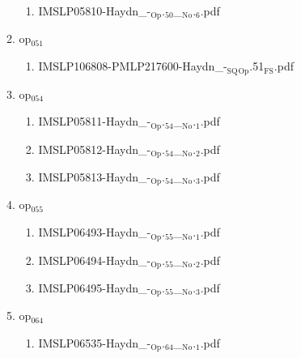 \documentclass[11pt]{article}
\begin{document}
\begin{enumerate}
\begin{enumerate}
\begin{enumerate}
\item IMSLP05810-Haydn\_-$_{\text{Op}}$.$_{\text{50}}$\_$_{\text{No}}$.$_{\text{6}}$.pdf
\label{sec-1-1-1-1-44-38-6-9-6}
\end{enumerate}

\item op$_{\text{051}}$
\label{sec-1-1-1-1-44-38-6-10}
\begin{enumerate}
\item IMSLP106808-PMLP217600-Haydn\_-$_{\text{SQ}}$$_{\text{Op}}$.51$_{\text{FS}}$.pdf
\label{sec-1-1-1-1-44-38-6-10-1}
\end{enumerate}

\item op$_{\text{054}}$
\label{sec-1-1-1-1-44-38-6-11}
\begin{enumerate}
\item IMSLP05811-Haydn\_-$_{\text{Op}}$.$_{\text{54}}$\_$_{\text{No}}$.$_{\text{1}}$.pdf
\label{sec-1-1-1-1-44-38-6-11-1}

\item IMSLP05812-Haydn\_-$_{\text{Op}}$.$_{\text{54}}$\_$_{\text{No}}$.$_{\text{2}}$.pdf
\label{sec-1-1-1-1-44-38-6-11-2}

\item IMSLP05813-Haydn\_-$_{\text{Op}}$.$_{\text{54}}$\_$_{\text{No}}$.$_{\text{3}}$.pdf
\label{sec-1-1-1-1-44-38-6-11-3}
\end{enumerate}

\item op$_{\text{055}}$
\label{sec-1-1-1-1-44-38-6-12}
\begin{enumerate}
\item IMSLP06493-Haydn\_-$_{\text{Op}}$.$_{\text{55}}$\_$_{\text{No}}$.$_{\text{1}}$.pdf
\label{sec-1-1-1-1-44-38-6-12-1}

\item IMSLP06494-Haydn\_-$_{\text{Op}}$.$_{\text{55}}$\_$_{\text{No}}$.$_{\text{2}}$.pdf
\label{sec-1-1-1-1-44-38-6-12-2}

\item IMSLP06495-Haydn\_-$_{\text{Op}}$.$_{\text{55}}$\_$_{\text{No}}$.$_{\text{3}}$.pdf
\label{sec-1-1-1-1-44-38-6-12-3}
\end{enumerate}

\item op$_{\text{064}}$
\label{sec-1-1-1-1-44-38-6-13}
\begin{enumerate}
\item IMSLP06535-Haydn\_-$_{\text{Op}}$.$_{\text{64}}$\_$_{\text{No}}$.$_{\text{1}}$.pdf
\label{sec-1-1-1-1-44-38-6-13-1}


\end{enumerate}
\end{enumerate}
\end{enumerate}
\end{document}

